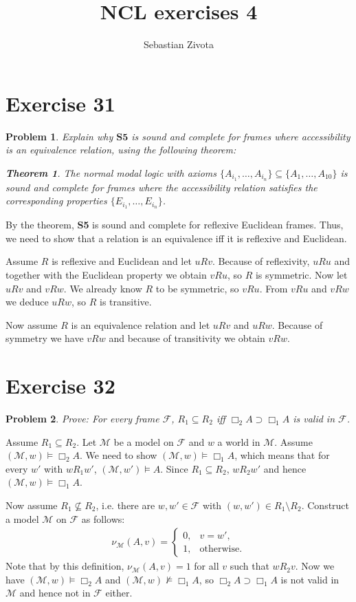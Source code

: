 \documentclass[a4paper,10pt]{article}
\title{NCL exercises 4}
\author{Sebastian Zivota}
\newcommand{\imp}{\supset}
\renewcommand{\S}[1]{\textbf{S#1}}
\newcommand{\F}{\mathcal{F}}
\newcommand{\M}{\mathcal{M}}
\newtheorem{theorem}{Theorem}
\newtheorem*{problem*}{Problem}
\theoremstyle{definition}
\begin{document}
\maketitle

\section*{Exercise 31}

\begin{problem*}
Explain why $\S5$ is sound and complete for frames where accessibility is an equivalence relation, using the following theorem:

\begin{theorem}
 The normal modal logic with axioms $\{A_{i_1},…,A_{i_n}\} \subseteq \{A_1,…,A_{10}\}$ is sound and complete for frames where the accessibility relation satisfies the corresponding properties $\{E_{i_1},…,E_{i_n}\}$.
\end{theorem}
\end{problem*}
By the theorem, \S5 is sound and complete for reflexive Euclidean frames. Thus, we need to show that a relation is an equivalence iff it is reflexive and Euclidean.

Assume $R$ is reflexive and Euclidean and let $u {R}v$. Because of reflexivity, $u {R} u$ and together with the Euclidean property we obtain $v {R} u$, so $R$ is symmetric. Now let $u {R} v$ and $v {R} w$. We already know $R$ to be symmetric, so $v {R} u$. From $v {R} u$ and $v {R} w$ we deduce $u {R} w$, so $R$ is transitive.

Now assume $R$ is an equivalence relation and let $u {R} v$ and $u {R} w$. Because of symmetry we have $v {R} w$ and because of transitivity we obtain $v {R} w$.
\section*{Exercise 32}
\begin{problem*}
Prove: For every frame $\F$, $R_1 \subseteq R_2$ iff $\Box_2 A \imp \Box_1 A$ is valid in $\F$.
\end{problem*}
Assume $R_1 \subseteq R_2$. Let $\M$ be a model on $\F$ and $w$ a world in $\M$. Assume $(\M, w) \models \Box_2 A$. We need to show $(\M, w) \models \Box_1 A$, which means that for every $w'$ with $w {R_1} w'$, $(\M, w') \models A$. Since $R_1 \subseteq R_2$, $w {R_2} w'$ and hence $(\M, w) \models \Box_1 A$.

Now assume $R_1 \not \subseteq R_2$, i.e. there are $w, w' \in \F$ with $(w,w') \in R_1\setminus R_2$. Construct a model $\M$ on $\F$ as follows:
\begin{align*}
ν_{\M}(A, v) =\begin{cases}
	      0, &v = w',\\
	      1, &\text{otherwise.}
              \end{cases}
\end{align*}
Note that by this definition, $ν_{\M}(A,v) = 1$ for all $v$ such that $w{R_2}v$. Now we have $(\M, w) \models \Box_2 A$ and $(\M, w) \not \models \Box_1 A$, so $\Box_2 A \imp \Box_1 A$ is not valid in $\M$ and hence not in $\F$ either.
\end{document}
